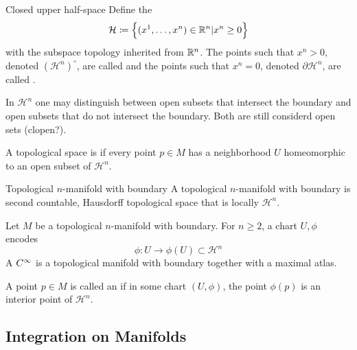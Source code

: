 \begin{definition}{Closed upper half-space}{}
    Define the 
    \[
        \mathcal{H} \coloneqq \left\{ (x^1, \dots, x^n) \in \mathbb{R}^n | x^n \geq 0 \right\}
    \]
    with the subspace topology inherited from \(\mathbb{R}^n\). 
    The points such that \(x^n >0 \), denoted \((\mathcal{H}^n)^\circ\), are called  and the points such that \(x^n = 0\), denoted \(\partial \mathcal{H}^n\), are called .
\end{definition}
\newcommand{\HH}{\mathcal{H}}
In \(\HH^n\) one may distinguish between open subsets that intersect the boundary and open subsets that do not intersect the boundary.
Both are still considerd open sets (clopen?).
\begin{definition}{}{}
    A topological space is \newterm{locally \(\HH^n\)} if every point \(p \in M\) has a neighborhood \(U\) homeomorphic to an open subset of \(\HH^n\).
\end{definition}
\begin{definition}{Topological \(n\)-manifold with boundary}{}
    A topological \(n\)-manifold with boundary is second countable, Hausdorff topological space that is locally \(\HH^n\).
\end{definition}

Let \(M\) be a topological \(n\)-manifold with boundary.
For \(n \geq 2\), a chart \(U, \phi\) encodes 
\[
    \phi \colon U \rightarrow \phi(U) \subset \HH^n   
\]
A \(C^\infty\)  is a topological manifold with boundary together with a maximal atlas.

A point \(p \in M\) is called an  if in some chart \((U, \phi)\), the point \(\phi(p)\) is an interior point of \(\HH^n\).

\subsection{Integration on Manifolds}

